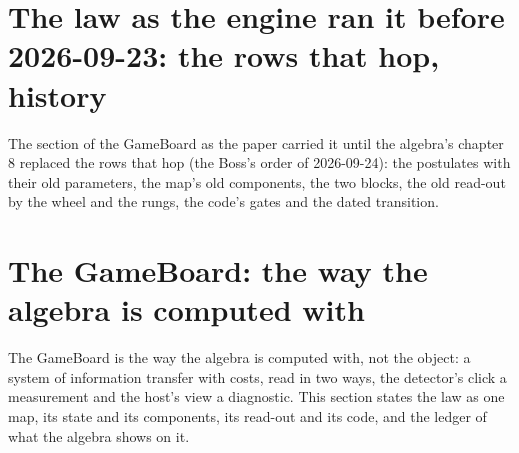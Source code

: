 \section{The law as the engine ran it before 2026-09-23: the rows that hop, history}\label{rec:oldlaw}

The section of the GameBoard as the paper carried it until the algebra's chapter 8 replaced the rows that hop (the Boss's order of 2026-09-24): the postulates with their old parameters, the map's old components, the two blocks, the old read-out by the wheel and the rungs, the code's gates and the dated transition.

\section{The GameBoard: the way the algebra is computed with}\label{sec:gameboard}

The GameBoard is the way the algebra is computed with, not the object: a system of information transfer with costs, read in two ways, the detector's click a measurement and the host's view a diagnostic. This section states the law as one map, its state and its components, its read-out and its code, and the ledger of what the algebra shows on it.


